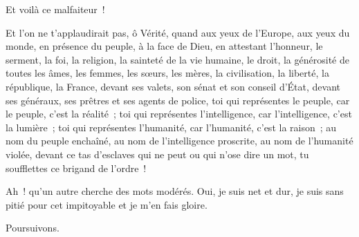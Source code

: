 \documentclass[french,twoside]{book} %
\begin{document}
Et voilà ce malfaiteur !\par
Et l’on ne t’applaudirait pas, ô Vérité, quand aux yeux de l’Europe, aux yeux du monde, en présence du peuple, à la face de Dieu, en attestant l’honneur, le serment, la foi, la religion, la sainteté de la vie humaine, le droit, la générosité de toutes les âmes, les femmes, les sœurs, les mères, la civilisation, la liberté, la république, la France, devant ses valets, son sénat et son conseil d’État, devant ses généraux, ses prêtres et ses agents de police, toi qui représentes le peuple, car le peuple, c’est la réalité ; toi qui représentes l’intelligence, car l’intelligence, c’est la lumière ; toi qui représentes l’humanité, car l’humanité, c’est la raison ; au nom du peuple enchaîné, au nom de l’intelligence proscrite, au nom de l’humanité violée, devant ce tas d’esclaves qui ne peut ou qui n’ose dire un mot, tu soufflettes ce brigand de l’ordre !\par
Ah ! qu’un autre cherche des mots modérés. Oui, je suis net et dur, je suis sans pitié pour cet impitoyable et je m’en fais gloire.\par
Poursuivons.\par
\end{document}

